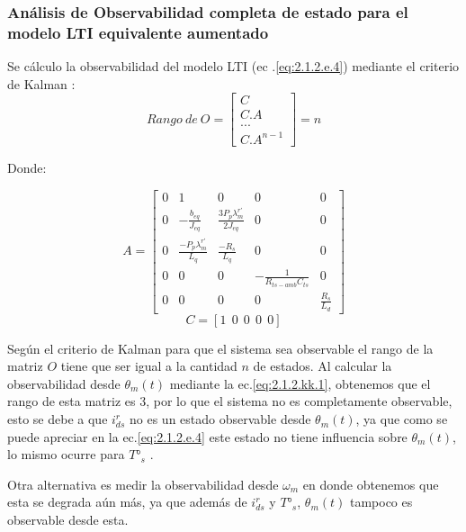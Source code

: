 \documentclass[10pt]{article}
\begin{document}
\subsubsection{Análisis de Observabilidad completa de estado para el modelo LTI equivalente aumentado}
Se cálculo la observabilidad del modelo LTI (ec .\ref{eq:2.1.2.e.4}) mediante el criterio de Kalman :
	\begin{equation}
	Rango \ de\  O=
	\begin{bmatrix}
	
		C\\ 
		C.A\\ 
		...\\ 
		C.A^{n-1}
		\end{bmatrix}=n
	\label{eq:2.1.2.kk.1}
	\end{equation}
	
	Donde:
	
		\begin{equation}
		A=\begin{bmatrix}
	0 & 1 &0 &0&0\\ 
	0 & -\frac{b_{eq}}{J_{eq}} & \frac{3 P_{p} \lambda^{r'}_{m}}{2 J_{eq}} & 0&0\\ 
	0  & \frac{- P_{p} \lambda^{r'}_{m}}{ L_{q}} & \frac{-R_{s}}{L_{q}} & 0&0\\
	0 & 0 & 0 & -\frac{1}{R_{ts-amb} C_{ts}}&0\\
	0&0&0&0&\frac{R_{s}}{L_{d}}
	\end{bmatrix}
	\label{eq:2.1.2.kk.2}
	\end{equation}
	\begin{equation}
		C=[1 \ \ 0 \ \ 0 \ \ 0 \ \ 0 ] 
	\label{eq:2.1.2.k.3}
	\end{equation}

	
Según el criterio de Kalman para que el sistema sea observable el rango de la matriz $O$ tiene que ser igual a la cantidad $n$ de estados. Al calcular la observabilidad desde $\theta_{m}(t)$ mediante la ec.\ref{eq:2.1.2.kk.1}, obtenemos que el rango de esta matriz es 3, por lo que el sistema no es completamente observable, esto se debe a que $i^{r}_{ds}$ no es un estado observable desde $\theta_{m}(t)$, ya que como se puede apreciar en la ec.\ref{eq:2.1.2.e.4} este estado no tiene influencia sobre  $\theta_{m}(t)$, lo mismo ocurre para $T°_{s}$ .

Otra alternativa es medir la observabilidad desde $\omega_{m}$ en donde obtenemos que esta se degrada aún más, ya que además de $i^{r}_{ds}$ y  $T°_{s}$, $\theta_{m}(t)$ tampoco es observable desde esta. 
\end{document}
